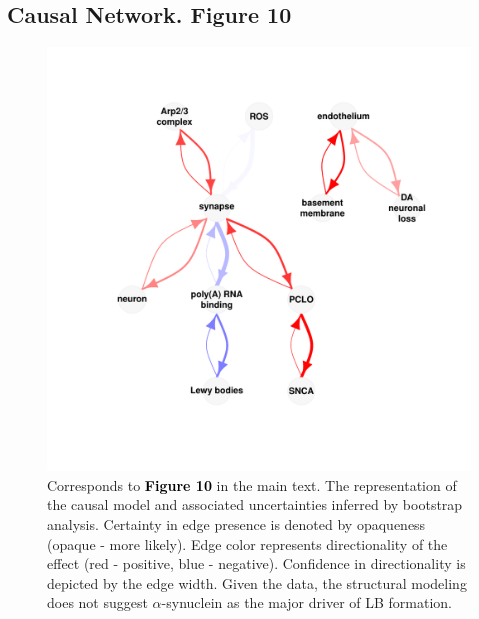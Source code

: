 \documentclass[11pt]{article}\usepackage[]{graphicx}\usepackage[usenames,dvipsnames]{color}
\newenvironment{knitrout}{}{} %
\begin{document}
\subsection{Causal Network. Figure 10}
\begin{figure}[h!]
\center
\begin{minipage}{0.95\textwidth}
\begin{knitrout}
\color{fgcolor}

{\centering \includegraphics[width=1\textwidth]{figure/visualization_path_causal_network-1} 

}



\end{knitrout}
\caption{Corresponds to \textcolor{black}{\colorbox{highlighter}{\textbf{Figure 10}}} in the main text.
The representation of the causal model and associated uncertainties inferred by
bootstrap analysis. Certainty in edge presence is denoted by opaqueness 
(opaque - more likely). Edge color represents directionality of the effect 
(red - positive, blue -  negative). Confidence in directionality is depicted by 
the edge width. Given the data, the structural modeling does not suggest 
$\alpha$-synuclein as the major driver of LB formation.}
\label{fig:CausalPathNetwork}
\end{minipage}
\end{figure}
\end{document}
